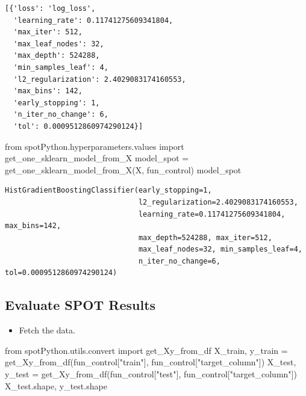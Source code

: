 \documentclass[
  letterpaper,
  DIV=11,
  numbers=noendperiod]{scrreprt}
\newenvironment{Shaded}{\begin{snugshade}}{\end{snugshade}}
\newcommand{\ImportTok}[1]{\textcolor[rgb]{0.00,0.46,0.62}{#1}}
\newcommand{\NormalTok}[1]{\textcolor[rgb]{0.00,0.23,0.31}{#1}}
\newcommand{\OperatorTok}[1]{\textcolor[rgb]{0.37,0.37,0.37}{#1}}
\newcommand{\StringTok}[1]{\textcolor[rgb]{0.13,0.47,0.30}{#1}}
\providecommand{\tightlist}{%
  \setlength{\itemsep}{0pt}\setlength{\parskip}{0pt}}\usepackage{longtable,booktabs,array}
\begin{document}
\begin{verbatim}
[{'loss': 'log_loss',
  'learning_rate': 0.11741275609341804,
  'max_iter': 512,
  'max_leaf_nodes': 32,
  'max_depth': 524288,
  'min_samples_leaf': 4,
  'l2_regularization': 2.4029083174160553,
  'max_bins': 142,
  'early_stopping': 1,
  'n_iter_no_change': 6,
  'tol': 0.0009512860974290124}]
\end{verbatim}

\begin{Shaded}
\begin{Highlighting}[]
\ImportTok{from}\NormalTok{ spotPython.hyperparameters.values }\ImportTok{import}\NormalTok{ get\_one\_sklearn\_model\_from\_X}
\NormalTok{model\_spot }\OperatorTok{=}\NormalTok{ get\_one\_sklearn\_model\_from\_X(X, fun\_control)}
\NormalTok{model\_spot}
\end{Highlighting}
\end{Shaded}

\begin{verbatim}
HistGradientBoostingClassifier(early_stopping=1,
                               l2_regularization=2.4029083174160553,
                               learning_rate=0.11741275609341804, max_bins=142,
                               max_depth=524288, max_iter=512,
                               max_leaf_nodes=32, min_samples_leaf=4,
                               n_iter_no_change=6, tol=0.0009512860974290124)
\end{verbatim}

\hypertarget{evaluate-spot-results-1}{%
\subsection{Evaluate SPOT Results}\label{evaluate-spot-results-1}}

\begin{itemize}
\tightlist
\item
  Fetch the data.
\end{itemize}

\begin{Shaded}
\begin{Highlighting}[]
\ImportTok{from}\NormalTok{ spotPython.utils.convert }\ImportTok{import}\NormalTok{ get\_Xy\_from\_df}
\NormalTok{X\_train, y\_train }\OperatorTok{=}\NormalTok{ get\_Xy\_from\_df(fun\_control[}\StringTok{"train"}\NormalTok{], fun\_control[}\StringTok{"target\_column"}\NormalTok{])}
\NormalTok{X\_test, y\_test }\OperatorTok{=}\NormalTok{ get\_Xy\_from\_df(fun\_control[}\StringTok{"test"}\NormalTok{], fun\_control[}\StringTok{"target\_column"}\NormalTok{])}
\NormalTok{X\_test.shape, y\_test.shape}
\end{Highlighting}
\end{Shaded}
\end{document}
